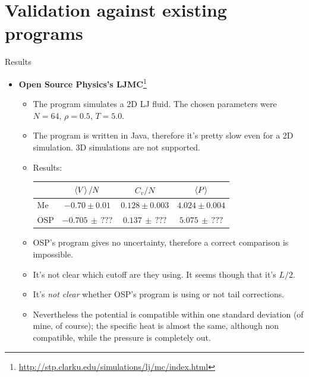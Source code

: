 \documentclass[10pt, compress, protectframetitle, handout]{beamer}
\begin{document}
\section{Validation against existing programs}

\begin{frame}[allowframebreaks]{Results}
	
	\begin{itemize}
		\item \textbf{Open Source Physics's LJMC}\footnote{\url{http://stp.clarku.edu/simulations/lj/mc/index.html}}
		\begin{itemize}
			\item The program simulates a 2D LJ fluid. The chosen parameters were $N=64$, $\rho = 0.5$, $T = 5.0$.
			\item The program is written in Java, therefore it's pretty slow even for a 2D simulation. 3D simulations are not supported.
			\item Results:
			\begin{table}
				\begin{tabular}{lccc}
					\toprule
					 & $\Braket{V}/N$ & $C_v/N$ & $\Braket{P}$ \\
					\midrule
					Me & $-0.70 \pm 0.01$ & $0.128 \pm 0.003$ & $4.024 \pm 0.004$ \\
					OSP & $-0.705 \, \pm \, ???$ & $0.137 \, \pm \, ???$ & $5.075 \, \pm \, ???$ \\
					\bottomrule
				\end{tabular}
			\end{table}
			\item OSP's program gives \alert{no uncertainty}, therefore a correct comparison is impossible.
			\item It's not clear which \alert{cutoff} are they using. It seems though that it's $L/2$.
			\item It's \emph{not clear} whether OSP's program is using or not \alert{tail corrections}.
			\item Nevertheless the potential is compatible within one standard deviation (of mine, of course); the specific heat is almost the same, although non compatible, while the pressure is completely out.
		\end{itemize}
		

\end{itemize}
\end{frame}
\end{document}
